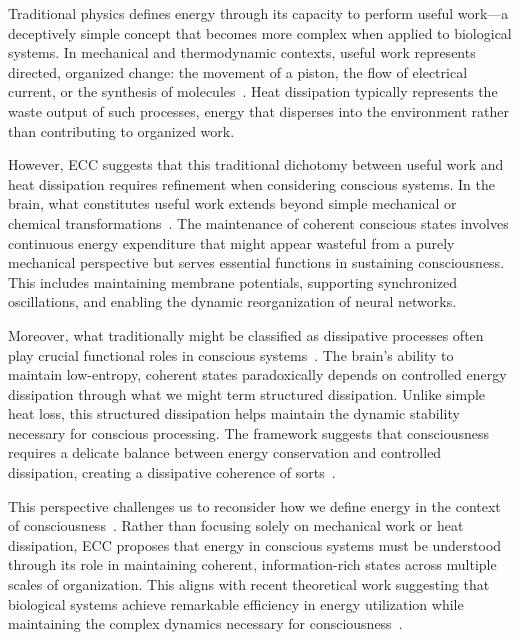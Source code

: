 Traditional physics defines energy through its capacity to perform useful work—a deceptively simple concept that becomes more complex when applied to biological systems. In mechanical and thermodynamic contexts, useful work represents directed, organized change: the movement of a piston, the flow of electrical current, or the synthesis of molecules~\cite{attwell2001}. Heat dissipation typically represents the waste output of such processes, energy that disperses into the environment rather than contributing to organized work.

However, ECC suggests that this traditional dichotomy between useful work and heat dissipation requires refinement when considering conscious systems. In the brain, what constitutes useful work extends beyond simple mechanical or chemical transformations~\cite{pellerin2004neuroenergetics}. The maintenance of coherent conscious states involves continuous energy expenditure that might appear wasteful from a purely mechanical perspective but serves essential functions in sustaining consciousness. This includes maintaining membrane potentials, supporting synchronized oscillations, and enabling the dynamic reorganization of neural networks.

Moreover, what traditionally might be classified as dissipative processes often play crucial functional roles in conscious systems~\cite{freeman2007}. The brain's ability to maintain low-entropy, coherent states paradoxically depends on controlled energy dissipation through what we might term structured dissipation. Unlike simple heat loss, this structured dissipation helps maintain the dynamic stability necessary for conscious processing. The framework suggests that consciousness requires a delicate balance between energy conservation and controlled dissipation, creating a dissipative coherence of sorts~\cite{breakspear2005dynamics}.

This perspective challenges us to reconsider how we define energy in the context of consciousness~\cite{demetrius2015}. Rather than focusing solely on mechanical work or heat dissipation, ECC proposes that energy in conscious systems must be understood through its role in maintaining coherent, information-rich states across multiple scales of organization. This aligns with recent theoretical work suggesting that biological systems achieve remarkable efficiency in energy utilization while maintaining the complex dynamics necessary for consciousness~\cite{pinotsis2023cytoelectric}.

